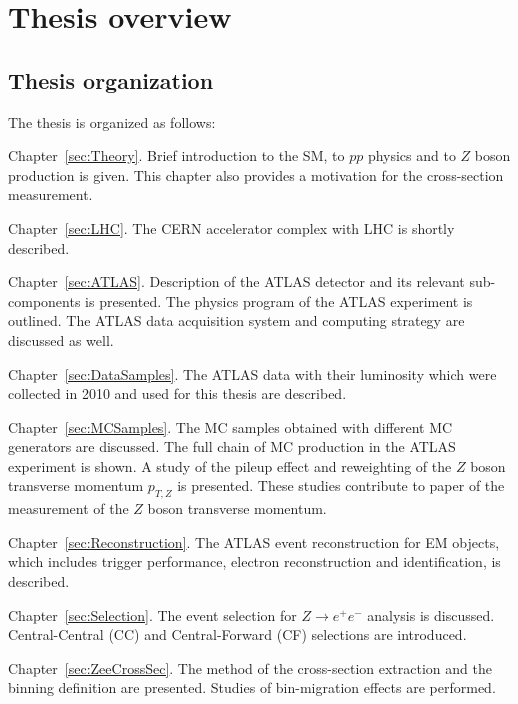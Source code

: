 \chapter{Thesis overview}
\label{sec:TOverview}

\section{Thesis organization}
\label{sec:TOrganization}

The thesis is organized as follows:
\begin{description} 
\item Chapter~\ref{sec:Theory}. Brief introduction to the SM, to $pp$ physics and to $Z$ boson production is given. This chapter also provides a motivation for the \Zee cross-section measurement.

\item Chapter~\ref{sec:LHC}. The CERN accelerator complex with LHC is shortly described.

\item Chapter~\ref{sec:ATLAS}. Description of the ATLAS detector and its relevant sub-components is presented. The physics program of the ATLAS experiment is outlined. The ATLAS data acquisition system and computing strategy are discussed as well.

\item Chapter~\ref{sec:DataSamples}. The ATLAS data with their luminosity which were collected in 2010 and used for this thesis are described. 

\item Chapter~\ref{sec:MCSamples}. The MC samples obtained with different MC generators are discussed. The full chain of MC production in the ATLAS experiment is shown. A study of the pileup effect and reweighting of the $Z$ boson transverse momentum $p_{T,Z}$ is presented. These studies contribute to paper of the measurement of the $Z$ boson transverse momentum.

\item Chapter~\ref{sec:Reconstruction}. The ATLAS event reconstruction for EM objects, which includes trigger performance, electron reconstruction and identification, is described.  

\item Chapter~\ref{sec:Selection}. The event selection for $Z \to e^+e^-$ analysis is discussed. Central-Central (CC) and Central-Forward (CF) selections are introduced.

\item Chapter~\ref{sec:ZeeCrossSec}. The method of the cross-section extraction and the binning definition are presented. Studies of bin-migration effects are performed.


\end{description}
